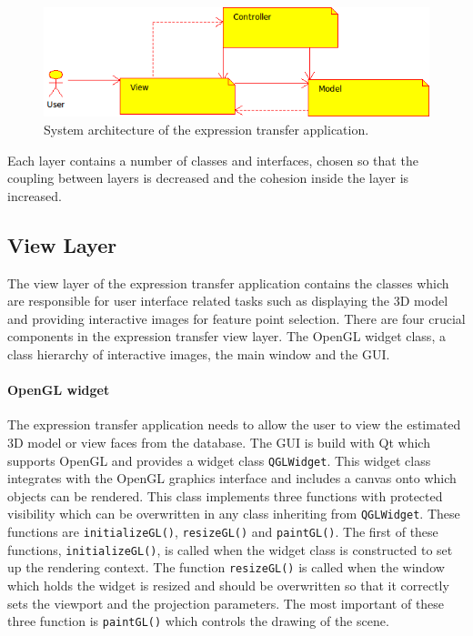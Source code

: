 \documentclass[11pt,a4paper]{report}
\begin{document}
\begin{figure}[H]
\begin{centering}
\includegraphics[scale=0.75]{images/mvc.png}
\par\end{centering}

\caption{System architecture of the expression transfer application.}
\label{fg:mvc}
\end{figure}

Each layer contains a number of classes and interfaces, chosen so that the coupling
between layers is decreased and the cohesion inside the layer is increased. 

\subsection{View Layer}
The view layer of the expression transfer application contains the classes which
are responsible for user interface related tasks such as displaying the 3D model
and providing interactive images for feature point selection. There are four
crucial components in the expression transfer view layer. The
OpenGL widget class, a class hierarchy of interactive images, the main
window and the GUI.

\paragraph{OpenGL widget}
The expression transfer application needs to allow the user to view the
estimated 3D model or view faces from the database. The GUI is build with Qt
which supports OpenGL and provides a widget class \texttt{QGLWidget}. This
widget class integrates with the OpenGL graphics interface and includes a canvas
onto which objects can be rendered. This class implements three functions with
protected visibility which
can be overwritten in any class inheriting from \texttt{QGLWidget}. These
functions are \texttt{initializeGL()}, \texttt{resizeGL()} and
\texttt{paintGL()}. The first of these functions, \texttt{initializeGL()}, is
called when the widget class is constructed to set up the rendering context. The function \texttt{resizeGL()} is
called when the window which holds the widget is resized and should be
overwritten so that it correctly sets the viewport and the projection parameters. The most important of
these three function is \texttt{paintGL()} which controls the drawing of the
scene.
\end{document}
